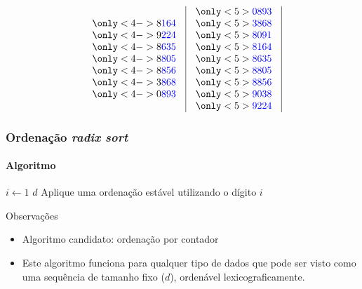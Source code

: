 \documentclass{beamer}
\begin{document}
\begin{frame}
$$\begin{array}{c|c|c|c|c}
\begin{array}{c}
    \only<4->{8\assert{164}} \\
    \only<4->{9\assert{224}} \\
    \only<4->{8\assert{635}} \\
    \only<4->{8\assert{805}} \\
    \only<4->{8\assert{856}} \\
    \only<4->{3\assert{868}} \\
    \only<4->{0\assert{893}}
  \end{array}
  &
  \begin{array}{c}
    \only<5>{\assert{0893}} \\
    \only<5>{\assert{3868}} \\
    \only<5>{\assert{8091}} \\
    \only<5>{\assert{8164}} \\
    \only<5>{\assert{8635}} \\
    \only<5>{\assert{8805}} \\
    \only<5>{\assert{8856}} \\
    \only<5>{\assert{9038}} \\
    \only<5>{\assert{9224}}
  \end{array}
  \end{array}
$$

\end{frame}

\begin{frame}
  \frametitle{Ordenação \textit{radix sort\/}}
  \framesubtitle{Algoritmo}

  \begin{codebox}
    \li \For $i \gets 1$ \To $d$
    \li \Do Aplique uma ordenação estável utilizando o dígito $i$
    \zi \End
  \end{codebox}
  \pause
  Observações
  \begin{itemize}
    \item Algoritmo candidato: ordenação por contador
    \item Este algoritmo funciona para qualquer tipo de dados que pode ser visto
      como uma sequência de tamanho fixo ($d$), ordenável
      \alert{lexicograficamente}.
  \end{itemize}
\end{frame}
\end{document}
